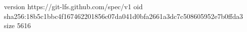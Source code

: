 version https://git-lfs.github.com/spec/v1
oid sha256:18b5c1bbc4f167462201856c07da041d0bfa2661a3dc7c508605952e7b0ffda3
size 5616
